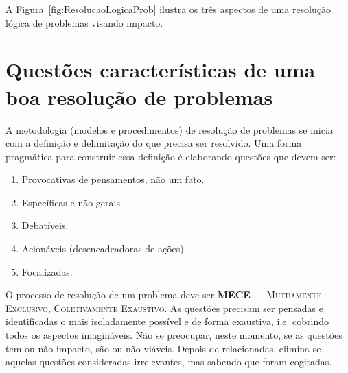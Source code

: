 A Figura~\ref{fig:ResolucaoLogicaProb} ilustra os três aspectos de uma resolução lógica de problemas visando impacto.


\section{Questões características de uma boa resolução de problemas}

A metodologia (modelos e procedimentos)  de resolução de problemas se inicia com a definição e delimitação do que precisa ser resolvido.  Uma forma pragmática para construir  essa definição é elaborando questões que devem ser:

\begin{enumerate}
	\item  Provocativas de pensamentos, não um fato.
	\item  Específicas e não gerais.
	\item  Debatíveis.
	\item  Acionáveis (desencadeadoras de ações).
	\item  Focalizadas.
\end{enumerate}

O processo de resolução de um problema deve ser \textbf{MECE} --- \textsc{Mutuamente
Exclusivo, Coletivamente Exaustivo}. As questões precisam ser pensadas e identificadas o mais  isoladamente possível e de forma exaustiva, i.e. cobrindo todos os aspectos imagináveis. Não se preocupar, neste momento, se as questões tem ou não impacto, são ou não viáveis. Depois de relacionadas, elimina-se aquelas  questões consideradas irrelevantes, mas sabendo que foram cogitadas. 

